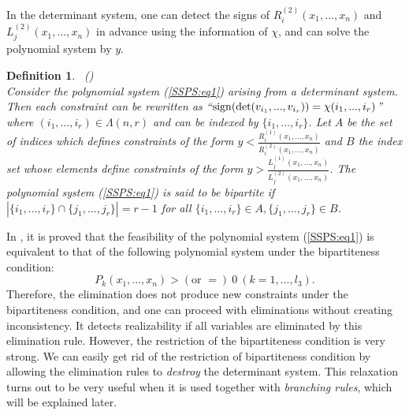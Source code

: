 \documentclass{article}
\newtheorem{defn}[thm]{\bfseries Definition}
\begin{document}
In the determinant system, one can detect the signs of $R^{(2)}_{i}(x_{1},...,x_{n})$ and $L^{(2)}_{j}(x_{1},...,x_{n})$
in advance using the information of $\chi$, and can solve the polynomial system by $y$.
\begin{defn}~\mbox{(\cite{BS86})}\\
Consider the polynomial system (\ref{SSPS:eq1}) arising from a determinant system.
Then each constraint can be rewritten as ``${\rm sign}(\det(v_{i_{1}},...,v_{i_{r}})) = \chi (i_{1},...,i_{r})$'' 
where $(i_1,\dots,i_r) \in \Lambda (n,r)$ and can be indexed by $\{ i_1,\dots,i_r \}$.
Let $A$ be the set of indices which defines constraints of the form $y < \frac{R^{(1)}_{i}(x_{1},...,x_{n})}{R^{(2)}_{i}(x_{1},...,x_{n})}$
and $B$ the index set whose elements define constraints of the form $y > \frac{L^{(1)}_{j}(x_{1},...,x_{n})}{L^{(2)}_{j}(x_{1},...,x_{n})}$.
The polynomial system (\ref{SSPS:eq1}) is said to be bipartite if
$|\{ i_1,\dots,i_r \} \cap \{ j_1,\dots,j_r\}| = r-1$ for all $\{ i_1,\dots,i_r \} \in A, \{ j_1,\dots,j_r\} \in B$.
\end{defn}
In \cite{BS86}, it is proved that the feasibility of the polynomial system (\ref{SSPS:eq1}) is equivalent to that of the following polynomial system 
under the bipartiteness condition:
\[ P_k(x_1,...,x_n) >  (\text{or }=) \ 0 \ (k=1,...,l_3). \]
Therefore, the elimination does not produce new constraints under the bipartiteness condition, and one can proceed with eliminations without creating inconsistency.
It detects realizability if all variables are eliminated by this elimination rule.
However, the restriction of the bipartiteness condition is very strong.
We can easily get rid of the restriction of bipartiteness condition by allowing
the elimination rules to {\it destroy} the determinant system.
This relaxation turns out to be very useful when it is used together with {\it branching rules},
which will be explained later.
\end{document}
